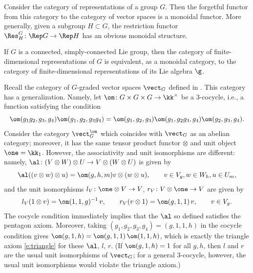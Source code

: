\begin{example}\label{x:rep-group-monoidal}
  Consider the category of representations of a group $G$. Then the
  forgetful functor from this category to the category of vector
  spaces is a monoidal functor. More generally, given
  a subgroup $H\subset G$, the restriction functor
  $\Res^G_H\colon \Rep G\to\Rep H$ has an
  obvious monoidal structure.
\end{example}
\begin{example}\label{x:rep-lie-group}
  If $G$ is a connected, simply-connected Lie group, then the category
  of finite-dimensional representations of $G$ is equivalent, as a
  monoidal category, to the category of finite-dimensional
  representations of its Lie
  algebra $\g$.
\end{example}

\begin{example}\label{x:vecg-twisted}
  Recall the category of $G$-graded vector spaces $\vect_G$ defined in
  . This category has a generalization. Namely, let
  $\om\colon G\times G\times G\to \kk^\times$ be a 3-cocycle, i.e., a
  function satisfying the condition
  $$
  \om(g_1g_2, g_3, g_4)\om (g_1, g_2, g_3g_4) = \om(g_1, g_2, g_3)
     \om(g_1, g_2g_3, g_4)\om (g_2, g_3, g_4).
  $$
  Consider the category $\vect^\om_G$ which coincides with $\vect_G$ as an
  abelian category; moreover, it has the same tensor product functor $\otimes$
  and unit object $\one=\kk_1$. However, the associativity and unit isomorphisms
  are different: namely, $\al \colon (V\otimes W)\otimes U \to V \otimes
  (W\otimes U)$ is given by
  $$
    \al((v \otimes w) \otimes u )= \om (g,h,m) v \otimes (w\otimes u),
    \qquad v\in V_g, w\in W_h, u\in U_m,
  $$
  and the unit isomorphisms $l_V\colon \one\otimes V\to V$,
  $r_V\colon V\otimes \one\to V$ are given by
  $$
    l_V(1\otimes v)=\om(1,1,g)^{-1}\, v, \qquad r_V(v\otimes 1)=\om(g,1,1)\, v,
    \qquad v\in V_g.
  $$
  The cocycle condition immediately implies that the $\al$ so defined satisfies
  the pentagon axiom. Moreover, taking $(g_1,g_2,g_3,g_4)=(g,1,1,h)$ in the
  cocycle condition gives $\om(g,1,h)=\om(g,1,1)\,\om(1,1,h)$, which is exactly
  the triangle axiom \eqref{e:triangle} for these $\al$, $l$, $r$. (If
  $\om(g,1,h)=1$ for all $g,h$, then $l$ and $r$ are the usual unit isomorphisms
  of $\vect_G$; for a general 3-cocycle, however, the usual unit isomorphisms
  would violate the triangle axiom.)
\end{example}
